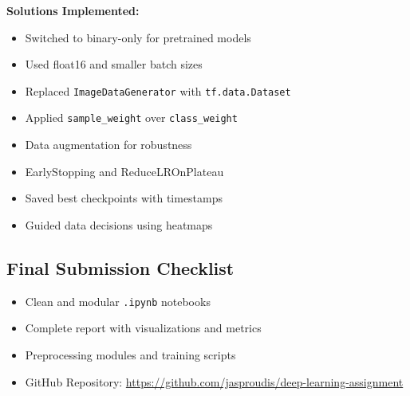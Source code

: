 \documentclass[11pt]{article}
\begin{document}
\textbf{Solutions Implemented:}
\begin{itemize}
    \item Switched to binary-only for pretrained models
    \item Used float16 and smaller batch sizes
    \item Replaced \texttt{ImageDataGenerator} with \texttt{tf.data.Dataset}
    \item Applied \texttt{sample\_weight} over \texttt{class\_weight}
    \item Data augmentation for robustness
    \item EarlyStopping and ReduceLROnPlateau
    \item Saved best checkpoints with timestamps
    \item Guided data decisions using heatmaps
\end{itemize}

\subsection*{Final Submission Checklist}
\begin{itemize}
    \item Clean and modular \texttt{.ipynb} notebooks
    \item Complete report with visualizations and metrics
    \item Preprocessing modules and training scripts
    \item GitHub Repository: \url{https://github.com/jasproudis/deep-learning-assignment}
\end{itemize}
\end{document}
